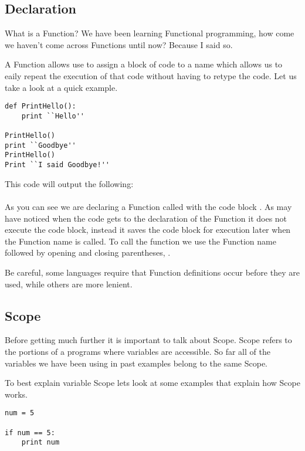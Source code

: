 \subsection{Declaration}
What is a Function?
We have been learning Functional programming, how come we haven't come across Functions until now?
Because I said so.
\par

A Function allows use to assign a block of code to a name which allows us to eaily repeat the execution of that code without having
to retype the code.
Let us take a look at a quick example.

\begin{lstlisting}[caption={Simply Function Example}]
def PrintHello():
    print ``Hello''

PrintHello()
print ``Goodbye''
PrintHello()
Print ``I said Goodbye!''
\end{lstlisting}

This code will output the following:\\
\\
As you can see we are declaring a Function called  with the code block .
As may have noticed when the code gets to the declaration of the Function it does not execute the code block, instead it
saves the code block for execution later when the Function name is called.
To call the function we use the Function name followed by opening and closing parentheses, .
\par

Be careful, some languages require that Function definitions occur before they are used, while others are more lenient.

\subsection{Scope}
Before getting much further it is important to talk about Scope.
Scope refers to the portions of a programs where variables are accessible.
So far all of the variables we have been using in past examples belong to the same Scope.
\par

To best explain variable Scope lets look at some examples that explain how Scope works.

\begin{lstlisting}[caption={Scope Example 1}]
num = 5

if num == 5:
    print num
\end{lstlisting}

